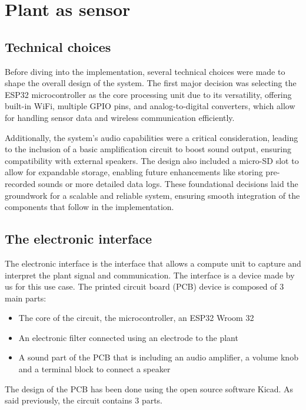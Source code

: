 \section{Plant as sensor}

\subsection{Technical choices}

Before diving into the implementation, several technical choices were made to shape the overall design of the system. The first major decision was selecting the ESP32 microcontroller as the core processing unit due to its versatility, offering built-in WiFi, multiple GPIO pins, and analog-to-digital converters, which allow for handling sensor data and wireless communication efficiently.

Additionally, the system's audio capabilities were a critical consideration, leading to the inclusion of a basic amplification circuit to boost sound output, ensuring compatibility with external speakers. The design also included a micro-SD slot to allow for expandable storage, enabling future enhancements like storing pre-recorded sounds or more detailed data logs. These foundational decisions laid the groundwork for a scalable and reliable system, ensuring smooth integration of the components that follow in the implementation.

\subsection{The electronic interface}

The electronic interface is the interface that allows a compute unit to capture and interpret the plant signal and
communication. The interface is a device made by us for this use case. The printed circuit board (PCB)
device is composed of 3 main parts:
\begin{itemize}
    \item The core of the circuit, the microcontroller, an ESP32 Wroom 32
    \item An electronic filter connected using an electrode to the plant
    \item A sound part of the PCB that is including an audio amplifier, a volume knob and a terminal block to connect a speaker
\end{itemize}

The design of the PCB has been done using the open source software Kicad.
As said previously, the circuit contains 3 parts.

